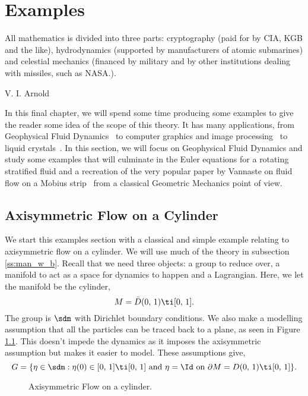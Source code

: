 
\chapter{Examples}
\epigraph{All mathematics is divided into three parts: cryptography (paid for by CIA, KGB and the like), hydrodynamics (supported by manufacturers of atomic submarines) and celestial mechanics (financed by military and by other institutions dealing with missiles, such as NASA.).}{V. I. Arnold}
\noindent
In this final chapter, we will spend some time producing some examples to give the reader some idea of the scope of this theory. It has many applications, from Geophysical Fluid Dynamics~\cite{ep_gfd} to computer graphics and image processing~\cite{holm} to liquid crystals~\cite{eppcf}. In this section, we will focus on Geophysical Fluid Dynamics and study some examples that will culminate in the Euler equations for a rotating stratified fluid and a recreation of the very popular paper by Vannaste on fluid flow on a Mobius strip~\cite{vanneste_2021} from a classical Geometric Mechanics point of view.

\section{Axisymmetric Flow on a Cylinder}
We start this examples section with a classical and simple example relating to axisymmetric flow on a cylinder. We will use much of the theory in subsection \ref{ss:man_w_b}. Recall that we need three objects: a group to reduce over, a manifold to act as a space for dynamics to happen and a Lagrangian. Here, we let the manifold be the cylinder,
$$ M = \bar D(0,\,1) \ti [0,\,1]. $$
The group is $\sdm$ with Dirichlet boundary conditions. We also make a modelling assumption that all the particles can be traced back to a plane, as seen in Figure \ref{fig:cylinder}. This doesn't impede the dynamics as it imposes the axisymmetric assumption but makes it easier to model. These assumptions give,
$$ G = \{\eta \in \sdm : \eta(0) \in [0,\,1]\ti[0,\,1] \text{ and } \eta = \Id \text{ on } \partial M = D(0,\,1) \ti [0,\,1]\}. $$

\begin{figure}[!ht]
\centering
\resizebox{0.4\textwidth}{!}{}
\caption{Axisymmetric Flow on a cylinder.}
\label{fig:cylinder}
\end{figure}

